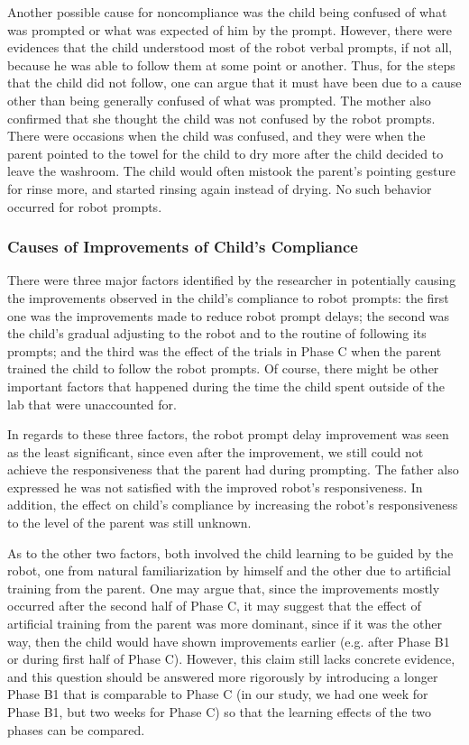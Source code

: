 Another possible cause for noncompliance was the child being confused of what was prompted or what was expected of him by the prompt.  However, there were evidences that the child understood most of the robot verbal prompts, if not all, because he was able to follow them at some point or another.  Thus, for the steps that the child did not follow, one can argue that it must have been due to a cause other than being generally confused of what was prompted.  The mother also confirmed that she thought the child was not confused by the robot prompts.  There were occasions when the child was confused, and they were when the parent pointed to the towel for the child to dry more after the child decided to leave the washroom.  The child would often mistook the parent's pointing gesture for rinse more, and started rinsing again instead of drying.  No such behavior occurred for robot prompts.


\subsubsection{Causes of Improvements of Child's Compliance}
There were three major factors identified by the researcher in potentially causing the improvements observed in the child's compliance to robot prompts: the first one was the improvements made to reduce robot prompt delays; the second was the child's gradual adjusting to the robot and to the routine of following its prompts; and the third was the effect of the trials in Phase C when the parent trained the child to follow the robot prompts.  Of course, there might be other important factors that happened during the time the child spent outside of the lab that were unaccounted for.

In regards to these three factors, the robot prompt delay improvement was seen as the least significant, since even after the improvement, we still could not achieve the responsiveness that the parent had during prompting.  The father also expressed he was not satisfied with the improved robot's responsiveness.   In addition, the effect on child's compliance by increasing the robot's responsiveness to the level of the parent was still unknown.

As to the other two factors, both involved the child learning to be guided by the robot, one from natural familiarization by himself and the other due to artificial training from the parent.  One may argue that, since the improvements mostly occurred after the second half of Phase C, it may suggest that the effect of artificial training from the parent was more dominant, since if it was the other way, then the child would have shown improvements earlier (e.g. after Phase B1 or during first half of Phase C).  However, this claim still lacks concrete evidence, and this question should be answered more rigorously by introducing a longer Phase B1 that is comparable to Phase C (in our study, we had one week for Phase B1, but two weeks for Phase C) so that the learning effects of the two phases can be compared.


